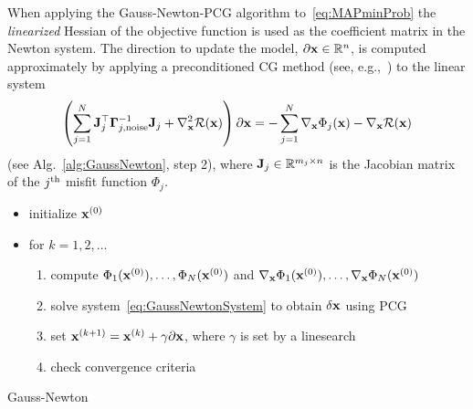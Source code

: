 \documentclass[11pt]{article}          %
\newcommand{\bbR}{\mathbb{R}}
\newcommand{\bfJ}{{\bf J}}
\newcommand{\bfx}{{\bf  x}}
\newcommand{\bfGamma}{\boldsymbol{\Gamma}}
\begin{document}
When applying the Gauss-Newton-PCG algorithm to~\eqref{eq:MAPminProb} the \emph{linearized} Hessian of the objective function is used as the coefficient matrix in the Newton system. The direction to update the model, $\partial \bfx \in \bbR^n$, is computed approximately by applying a preconditioned CG method (see, e.g.,~\cite{Saad2003}) to the linear system
\begin{align}
  \left( 
    \sum_{j=1}^{N} \bfJ_j^\top \bfGamma_{j,\rm{noise}}^{-1} \bfJ_j
    +
    \nabla_\bfx^2 \mathcal{R}(\bfx)
  \right)
  \partial \bfx = - \sum_{j=1}^{N} \nabla_{\bfx} \Phi_j(\bfx) - \nabla_\bfx \mathcal{R}(\bfx)
  \label{eq:GaussNewtonSystem}
\end{align}
(see Alg.~\ref{alg:GaussNewton}, step 2), where $\bfJ_j \in \bbR^{m_j \times n}$ is the Jacobian matrix of the $j^{\rm th}$ misfit function $\Phi_j$.
\begin{algorithm}[t]
  \begin{itemize}
    \item initialize $\bfx^{(0)}$
    \item for $k=1,2,\ldots$
    \begin{enumerate}
      \item compute $\Phi_1(\bfx^{(0)}),\ldots,\Phi_N(\bfx^{(0)})$ and $\nabla_{\bfx} \Phi_1(\bfx^{(0)}),\ldots, \nabla_{\bfx} \Phi_N(\bfx^{(0)})$
      \item solve system~\eqref{eq:GaussNewtonSystem} to obtain $\delta \bfx$ using PCG
      \item set $\bfx^{(k+1)} = \bfx^{(k)} + \gamma \partial \bfx$, where $\gamma$ is set by a linesearch
      \item check convergence criteria
    \end{enumerate}
  \end{itemize}
 \caption{Gauss-Newton}
 \label{alg:GaussNewton}
\end{algorithm}
\end{document}
